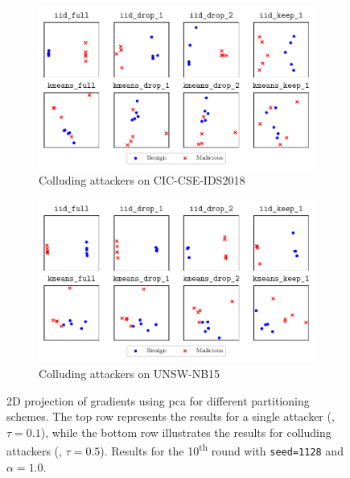 \begin{figure}
  \begin{subfigure}[t]{0.48\linewidth}
    \centering
    \includegraphics[width=\linewidth]{figures/cicids/similarity-untargeted-colluding}
    \caption{
      Colluding attackers on CIC-CSE-IDS2018
      \label{fig:assess.similarity.colluding-cicids}
    }
  \end{subfigure}
  \hfill
  \begin{subfigure}[t]{0.48\linewidth}
    \centering
    \includegraphics[width=\linewidth]{figures/nb15/similarity-untargeted-colluding}
    \caption{
      Colluding attackers on UNSW-NB15
      \label{fig:assess.similarity.colluding-nb15}
    }
  \end{subfigure}
  \caption[
    2D projection of gradients using \gls{pca} for different partitioning schemes.
  ]{
    2D projection of gradients using \gls{pca} for different partitioning schemes.
    The top row represents the results for a single attacker (\ie, $\tau=0.1$), while the bottom row illustrates the results for colluding attackers (\ie, $\tau=0.5$).
    Results for the 10\textsuperscript{th} round with \texttt{seed=1128} and $\alpha=1.0$. 
    \label{fig:assess.similarity}
  }
\end{figure}


